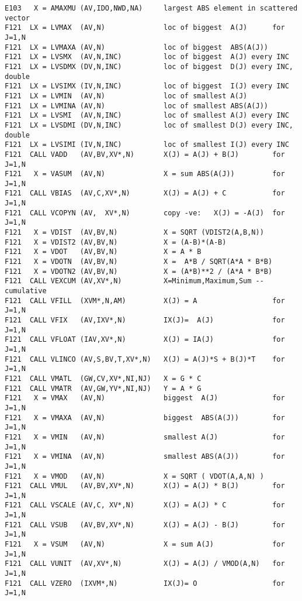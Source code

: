 \begin{verbatim}
E103   X = AMAXMU (AV,IDO,NWD,NA)     largest ABS element in scattered vector
F121  LX = LVMAX  (AV,N)              loc of biggest  A(J)      for J=1,N
F121  LX = LVMAXA (AV,N)              loc of biggest  ABS(A(J))
F121  LX = LVSMX  (AV,N,INC)          loc of biggest  A(J) every INC
F121  LX = LVSDMX (DV,N,INC)          loc of biggest  D(J) every INC, double
F121  LX = LVSIMX (IV,N,INC)          loc of biggest  I(J) every INC
F121  LX = LVMIN  (AV,N)              loc of smallest A(J)
F121  LX = LVMINA (AV,N)              loc of smallest ABS(A(J))
F121  LX = LVSMI  (AV,N,INC)          loc of smallest A(J) every INC
F121  LX = LVSDMI (DV,N,INC)          loc of smallest D(J) every INC, double
F121  LX = LVSIMI (IV,N,INC)          loc of smallest I(J) every INC
F121  CALL VADD   (AV,BV,XV*,N)       X(J) = A(J) + B(J)        for J=1,N
F121   X = VASUM  (AV,N)              X = sum ABS(A(J))         for J=1,N
F121  CALL VBIAS  (AV,C,XV*,N)        X(J) = A(J) + C           for J=1,N
F121  CALL VCOPYN (AV,  XV*,N)        copy -ve:   X(J) = -A(J)  for J=1,N
F121   X = VDIST  (AV,BV,N)           X = SQRT (VDIST2(A,B,N))
F121   X = VDIST2 (AV,BV,N)           X = (A-B)*(A-B)
F121   X = VDOT   (AV,BV,N)           X = A * B
F121   X = VDOTN  (AV,BV,N)           X =  A*B / SQRT(A*A * B*B)
F121   X = VDOTN2 (AV,BV,N)           X = (A*B)**2 / (A*A * B*B)
F121  CALL VEXCUM (AV,XV*,N)          X=Minimum,Maximum,Sum -- cumulative
F121  CALL VFILL  (XVM*,N,AM)         X(J) = A                  for J=1,N
F121  CALL VFIX   (AV,IXV*,N)         IX(J)=  A(J)              for J=1,N
F121  CALL VFLOAT (IAV,XV*,N)         X(J) = IA(J)              for J=1,N
F121  CALL VLINCO (AV,S,BV,T,XV*,N)   X(J) = A(J)*S + B(J)*T    for J=1,N
F121  CALL VMATL  (GW,CV,XV*,NI,NJ)   X = G * C
F121  CALL VMATR  (AV,GW,YV*,NI,NJ)   Y = A * G
F121   X = VMAX   (AV,N)              biggest  A(J)             for J=1,N
F121   X = VMAXA  (AV,N)              biggest  ABS(A(J))        for J=1,N
F121   X = VMIN   (AV,N)              smallest A(J)             for J=1,N
F121   X = VMINA  (AV,N)              smallest ABS(A(J))        for J=1,N
F121   X = VMOD   (AV,N)              X = SQRT ( VDOT(A,A,N) )
F121  CALL VMUL   (AV,BV,XV*,N)       X(J) = A(J) * B(J)        for J=1,N
F121  CALL VSCALE (AV,C, XV*,N)       X(J) = A(J) * C           for J=1,N
F121  CALL VSUB   (AV,BV,XV*,N)       X(J) = A(J) - B(J)        for J=1,N
F121   X = VSUM   (AV,N)              X = sum A(J)              for J=1,N
F121  CALL VUNIT  (AV,XV*,N)          X(J) = A(J) / VMOD(A,N)   for J=1,N
F121  CALL VZERO  (IXVM*,N)           IX(J)= O                  for J=1,N
\end{verbatim}

